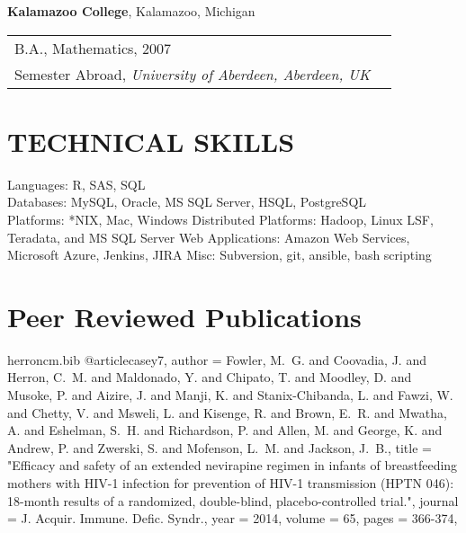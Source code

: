 \documentclass{res}
\begin{document}
\begin{resume}

\textbf{Kalamazoo College}, Kalamazoo, Michigan\\
\begin{tabular}{ p{10cm} l }
B.A., {Mathematics}, 2007\\
Semester Abroad, \textit{University of Aberdeen, Aberdeen, UK}
\end{tabular}


\section{TECHNICAL SKILLS} 
Languages: R, SAS, SQL\\
Databases: MySQL, Oracle, MS SQL Server, HSQL, PostgreSQL\\
Platforms: *NIX, Mac, Windows
Distributed Platforms: Hadoop, Linux LSF, Teradata, and MS SQL Server
Web Applications: Amazon Web Services, Microsoft Azure, Jenkins, JIRA
Misc: Subversion, git, ansible, bash scripting 

\renewcommand\refname{}
\section{Peer Reviewed Publications}
\renewcommand{\section}[2]{}%
\begin{filecontents}{herroncm.bib}
@article{casey7,
author = {{Fowler}, M.~G. and {Coovadia}, J. and {Herron}, C.~M. and {Maldonado}, Y. and {Chipato}, T. and {Moodley}, D. and {Musoke}, P. and {Aizire}, J. and {Manji}, K. and {Stanix-Chibanda}, L. and {Fawzi}, W. and {Chetty}, V. and {Msweli}, L. and {Kisenge}, R. and {Brown}, E.~R. and {Mwatha}, A. and {Eshelman}, S.~H. and {Richardson}, P. and {Allen}, M. and {George}, K. and {Andrew}, P. and {Zwerski}, S. and {Mofenson}, L.~M. and {Jackson}, J.~B.},
title = "{Efficacy and safety of an extended nevirapine regimen in infants of breastfeeding mothers with HIV-1 infection for prevention of HIV-1 transmission (HPTN 046): 18-month results of a randomized, double-blind, placebo-controlled trial.}",
journal = {J. Acquir. Immune. Defic. Syndr.},
year = 2014,
volume = 65,
pages = {366-374},
}


\end{filecontents}
\end{resume}
\end{document}
